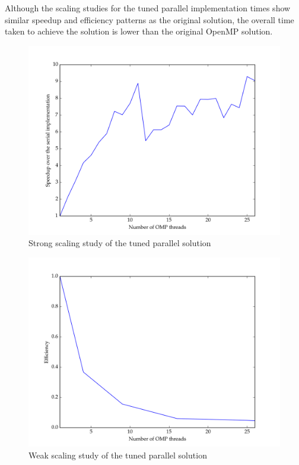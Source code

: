 \documentclass[11pt]{article}
\begin{document}
Although the scaling studies for the tuned parallel implementation times show similar speedup and efficiency patterns as the original solution, the overall time taken to achieve the solution is lower than the original OpenMP solution. 
\begin{figure}[H]
\centering
\includegraphics[scale=0.5]{./scaling_studies/strong_scaling_elliot.png}
\caption{Strong scaling study of the tuned parallel solution}
\label{fig:ss_elliot}
\end{figure}

\begin{figure}[H]
\centering
\includegraphics[scale=0.5]{./scaling_studies/weak_scaling_elliot.png}
\caption{Weak scaling study of the tuned parallel solution}
\label{fig:ws_elliot}
\end{figure}
\end{document}
